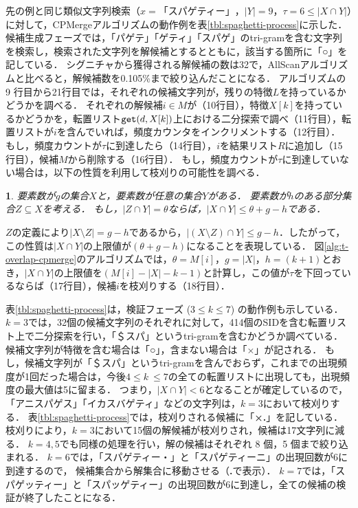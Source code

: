 \documentclass[japanese]{jnlp_JS2.0}
\newtheorem{property}{}
\begin{document}
先の例と同じ類似文字列検索（$x = \mbox{「スパゲティー」}$，$|Y| = 9$，$\tau = 6 \leq |X \cap Y|$）に対して，CPMergeアルゴリズムの動作例を表\ref{tbl:spaghetti-process}に示した．
候補生成フェーズでは，「パゲテ」「ゲティ」「スパゲ」のtri-gramを含む文字列を検索し，検索された文字列を解候補とするとともに，該当する箇所に「○」を記している．
シグニチャから獲得される解候補の数は32で，AllScanアルゴリズムと比べると，解候補数を0.105\%まで絞り込んだことになる．
アルゴリズムの 9 行目から21行目では，それぞれの候補文字列が，残りの特徴$L$を持っているかどうかを調べる．
それぞれの解候補$i \in M$が（10行目），特徴$X[k]$を持っているかどうかを，転置リスト$\mbox{\tt get}(d, X[k])$上における二分探索で調べ（11行目），転置リストが$i$を含んでいれば，頻度カウンタをインクリメントする（12行目）．
もし，頻度カウントが$\tau$に到達したら（14行目），$i$を結果リスト$R$に追加し（15行目），候補$M$から削除する（16行目）．
もし，頻度カウントが$\tau$に到達していない場合は，以下の性質を利用して枝刈りの可能性を調べる．
\begin{property}
要素数が$g$の集合$X$と，要素数が任意の集合$Y$がある．
要素数が$h$のある部分集合$Z \subseteq X$を考える．
もし，$|Z \cap Y| = \theta$ならば，$|X \cap Y| \leq \theta + g - h$である．
\end{property}
$Z$の定義により$|X \setminus Z| = g - h$であるから，$|(X \setminus Z) \cap Y| \leq g - h$．したがって，この性質は$|X \cap Y|$の上限値が$(\theta + g - h)$になることを表現している．
図\ref{alg:t-overlap-cpmerge}のアルゴリズムでは，$\theta = M[i]$，$g = |X|$，$h = (k + 1)$とおき，$|X \cap Y|$の上限値を$(M[i] - |X| - k - 1)$と計算し，この値が$\tau$を下回っているならば（17行目），候補$i$を枝刈りする（18行目）．

\begin{table}[p]
\label{tbl:spaghetti-process}

\end{table}

表\ref{tbl:spaghetti-process}は，検証フェーズ ($3 \leq k \leq 7$) の動作例も示している．
$k = 3$では，32個の候補文字列のそれぞれに対して，414個のSIDを含む転置リスト上で二分探索を行い，「＄スパ」というtri-gramを含むかどうか調べている．
候補文字列が特徴を含む場合は「○」，含まない場合は「×」が記される．
もし，候補文字列が「＄スパ」というtri-gramを含んでおらず，これまでの出現頻度が1回だった場合は，今後$4 \leq k \ \leq 7$の全ての転置リストに出現しても，出現頻度の最大値は5に留まる．
つまり，$|X \cap Y| < 6$となることが確定しているので，「アニスパゲス」「イカスバゲティ」などの文字列は，$k = 3$において枝刈りする．
表\ref{tbl:spaghetti-process}では，枝刈りされる候補に「{\bf ×.}」を記している．
枝刈りにより，$k = 3$において15個の解候補が枝刈りされ，候補は17文字列に減る．
$k = 4, 5$でも同様の処理を行い，解の候補はそれぞれ 8 個，5 個まで絞り込まれる．
$k = 6$では，「スパゲティー・」と「スパゲティーニ」の出現回数が6に到達するので，
    候補集合から解集合に移動させる（\scalebox{1.7}{$\boldsymbol{\circ}$}\textbf{.}で表示）．
$k = 7$では，「スパゲッティー」と「スパッゲティー」の出現回数が6に到達し，全ての候補の検証が終了したことになる．
\end{document}

